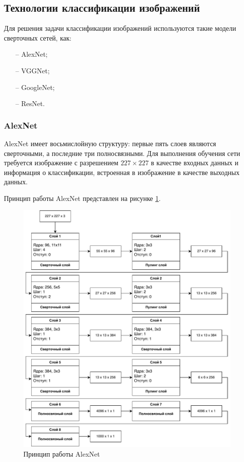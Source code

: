 \newpage
\subsection{Технологии классификации изображений}
Для решения задачи классификации изображений используются такие модели сверточных сетей, как\cite{models-comprasion}: 
\begin{itemize}[leftmargin=1.6\parindent]
	\item[--] AlexNet;
	\item[--] VGGNet;
	\item[--] GoogleNet;
	\item[--] ResNet.
\end{itemize}

\subsubsection{AlexNet}
 AlexNet имеет восьмислойную структуру: первые пять слоев являются сверточными, а последние три полносвязными. Для выполнения обучения сети требуется изображение с разрешением $227 \times 227$ в качестве входных данных и информация о классификации, встроенная в изображение в качестве выходных данных.
 
Принцип работы AlexNet представлен на рисунке \ref{fig:alexnet}.

\begin{figure}[hbtp]
	\centering
	\includegraphics[width=\textwidth]{img/alexnet.pdf}
	\caption{Принцип работы AlexNet}
	\label{fig:alexnet}
\end{figure}
\clearpage

